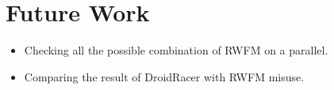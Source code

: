 \documentclass[11pt]{report}
\begin{document}
\chapter{Future Work}
\begin{itemize}
 \item Checking all the possible combination of RWFM on a parallel.
 \item Comparing the result of DroidRacer with RWFM misuse.
\end{itemize}
\end{document}
